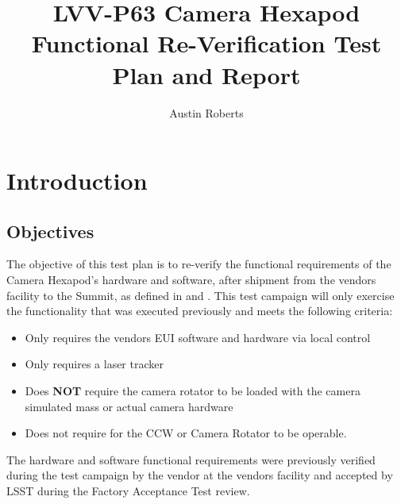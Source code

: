\documentclass[SE,lsstdraft,STR,toc]{lsstdoc}
\providecommand{\tightlist}{
  \setlength{\itemsep}{0pt}\setlength{\parskip}{0pt}}
\begin{document}
\def\milestoneName{Camera Hexapod Functional Re-Verification}
\def\milestoneId{LVV-P63}
\def\product{SIT-COM Integration}


\title{ LVV-P63 Camera Hexapod Functional Re-Verification Test Plan and Report}
\setDocRef{\lsstDocType-\lsstDocNum}
\date{\vcsdate}
\author{ Austin Roberts }






\maketitle

\section{Introduction}
\label{sect:intro}


\subsection{Objectives}
\label{sect:objectives}

The objective of this test plan is to re-verify the functional
requirements of the Camera Hexapod's hardware and software, after
shipment from the vendors facility to the Summit, as defined in 
and . This test campaign will only exercise the functionality
that was executed previously and meets the following criteria:

\begin{itemize}
\tightlist
\item
  Only requires the vendors EUI software and hardware via local control
\item
  Only requires a laser tracker
\item
  Does \textbf{NOT} require the camera rotator to be loaded with the
  camera simulated mass or actual camera hardware
\item
  Does not require for the CCW or Camera Rotator to be operable.
\end{itemize}

The hardware and software functional requirements were previously
verified during the test campaign by the vendor at the vendors facility
and accepted by LSST during the Factory Acceptance Test review.
\end{document}
